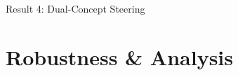 \documentclass[aspectratio=169, 11pt]{beamer}
\begin{document}
\begin{frame}{Result 4: Dual-Concept Steering}
\end{frame}

\section{Robustness \& Analysis}
\end{document}
